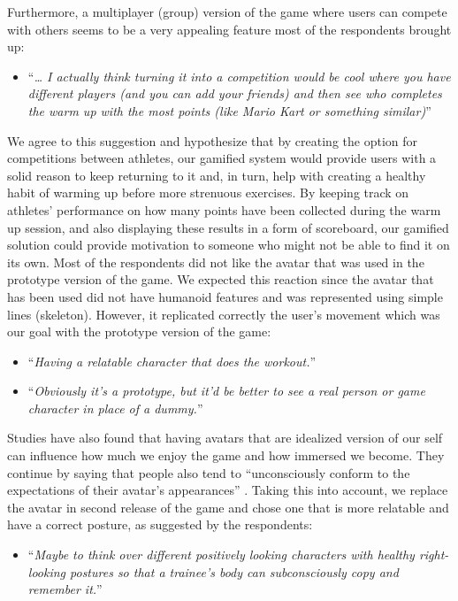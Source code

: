 Furthermore, a multiplayer (group) version of the game where users can compete with others seems to be a very appealing feature most of the respondents brought up: 
\begin{itemize}
\item ``\textit{… I actually think turning it into a competition would be cool where you have different players (and you can add your friends) and then see who completes the warm up with the most points (like Mario Kart or something similar)}''
\end{itemize}
We agree to this suggestion and hypothesize that by creating the option for competitions between athletes, our gamified system would provide users with a solid reason to keep returning to it and, in turn, help with creating a healthy habit of warming up before more strenuous exercises. By keeping track on athletes' performance on how many points have been collected during the warm up session, and also displaying these results in a form of scoreboard, our gamified solution could provide motivation to someone who might not be able to find it on its own.
Most of the respondents did not like the avatar that was used in the prototype version of the game. We expected this reaction since the avatar that has been used did not have humanoid features and was represented using simple lines (skeleton). However, it replicated correctly the user's movement which was our goal with the prototype version of the game: 
\begin{itemize}
\item ``\textit{Having a relatable character that does the workout.}''
\item ``\textit{Obviously it's a prototype, but it'd be better to see a real person or game character in place of a dummy.}''
\end{itemize}
Studies have also found that having avatars that are idealized version of our self can influence how much we enjoy the game and how immersed we become. They continue by saying that people also tend to ``unconsciously conform to the expectations of their avatar's appearances'' \cite{avatar}. Taking this into account, we replace the avatar in second release of the game and chose one that is more relatable and have a correct posture, as suggested by the respondents: 
\begin{itemize}
\item ``\textit{Maybe to think over different positively looking characters with healthy right-looking postures so that a trainee's body can subconsciously copy and remember it.}''
\end{itemize}
